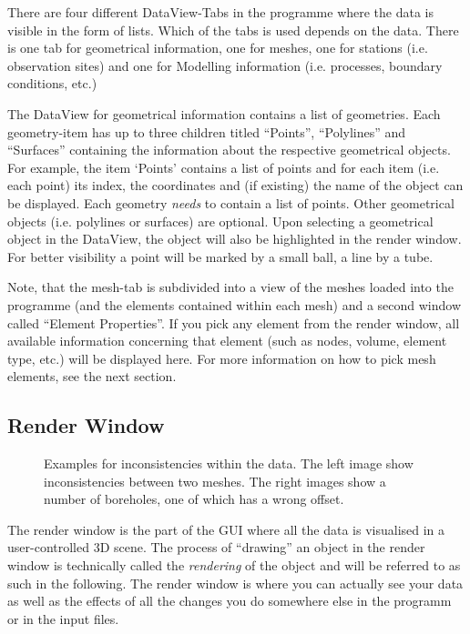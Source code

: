 There are four different DataView-Tabs in the programme where the data is visible in the form of lists. Which of the tabs is used depends on the data. There is one tab for geometrical information, one for meshes, one for stations (i.e. observation sites) and one for Modelling information (i.e. processes, boundary conditions, etc.)

The DataView for geometrical information contains a list of geometries. Each geometry-item has up to three children titled ``Points'', ``Polylines'' and ``Surfaces'' containing the information about the respective geometrical objects. For example, the item `Points' contains a list of points and for each item (i.e. each point) its index, the coordinates and (if existing) the name of the object can be displayed. Each geometry \emph{needs} to contain a list of points. Other geometrical objects (i.e. polylines or surfaces) are optional. Upon selecting a geometrical object in the DataView, the object will also be highlighted in the render window. For better visibility a point will be marked by a small ball, a line by a tube.

Note, that the mesh-tab is subdivided into a view of the meshes loaded into the programme (and the elements contained within each mesh) and a second window called ``Element Properties''. If you pick any element from the render window, all available information concerning that element (such as nodes, volume, element type, etc.) will be displayed here. For more information on how to pick mesh elements, see the next section.

\subsection{Render Window}

\begin{figure}[tb]
\begin{center}
\enspace
{}
\end{center}
\caption{Examples for inconsistencies within the data. The left image show inconsistencies between two meshes. The right images show a number of boreholes, one of which has a wrong offset.} \label{fig:error}
\end{figure}

The render window is the part of the GUI where all the data is visualised in a user-controlled 3D scene. The process of ``drawing'' an object in the render window is technically called the \emph{rendering} of the object and will be referred to as such in the following. The render window is where you can actually see your data as well as the effects of all the changes you do somewhere else in the programm or in the input files.


